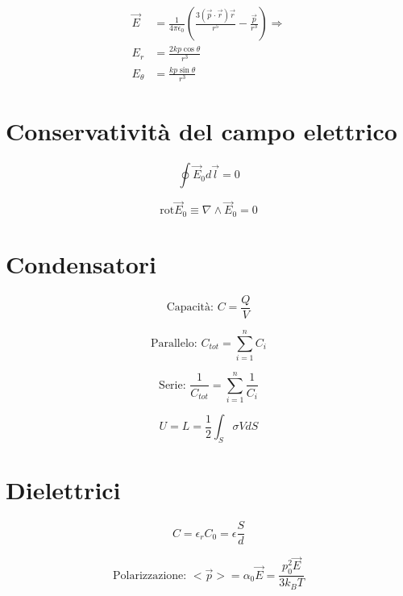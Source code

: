 \documentclass[a4paper,11pt]{article}
\begin{document}
\begin{multicols}{3}
		\begin{align*}
			\vec{E} &= \frac{1}{4\pi\epsilon_0} \left(\frac{3(\vec{p}\cdot\vec{r})\vec{r}}{r^5} - \frac{\vec{p}}{r^3}\right) \Rightarrow \\
			E_r &= \frac{2kp\cos\theta}{r^3} \\
			E_\theta &= \frac{kp\sin\theta}{r^3}			
		\end{align*}
		
		\section{Conservatività del campo elettrico}
		
		\begin{equation}
			\oint\vec{E}_0d\vec{l}=0
		\end{equation}
	
		\begin{equation}
			\text{rot}\vec{E}_0 \equiv \nabla \wedge \vec{E}_0 = 0
		\end{equation}
	
	
		\section{Condensatori}
		\begin{equation}
			\text{Capacità: } C=\frac{Q}{V}
		\end{equation}
		
		\begin{equation}
			\text{Parallelo: } C_{tot} = \sum_{i=1}^{n}C_{i}
		\end{equation}
	
		\begin{equation}
			\text{Serie: } \frac{1}{C_{tot}} = \sum_{i=1}^{n}\frac{1}{C_{i}}
		\end{equation}
	
		\begin{equation}
			U = L = \frac{1}{2} \int_{S}\sigma VdS
		\end{equation}
	
		\section{Dielettrici}
		\begin{equation}
			C = \epsilon_rC_0 = \epsilon\frac{S}{d}
		\end{equation}
	
		\begin{equation}
			\text{Polarizzazione: } <\vec{p}> = \alpha_0\vec{E} = \frac{p_0^2\vec{E}}{3k_BT}
		\end{equation}
	

\end{multicols}
\end{document}
